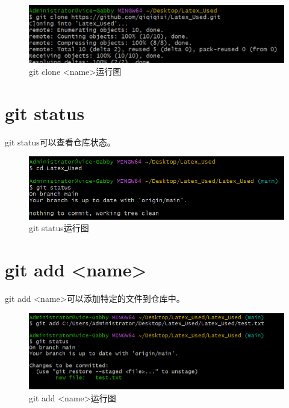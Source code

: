 \documentclass{article}
\begin{document}
\begin{figure}[H]
    \centering
    \includegraphics[width=1\linewidth]{git_clone.png}
    \caption{git clone <name>运行图}
    \label{fig:clone1}
\end{figure}

\section{git status}
git status可以查看仓库状态。
\begin{figure}[H]
    \centering
    \includegraphics[width=1\linewidth]{git_status.png}
    \caption{git status运行图}
    \label{fig:status}
\end{figure}

\section{git add <name>}
git add <name>可以添加特定的文件到仓库中。
\begin{figure}[H]
    \centering
    \includegraphics[width=1\linewidth]{git_add_name.png}
    \caption{git add <name>运行图}
    \label{fig:add}
\end{figure}
\end{document}
